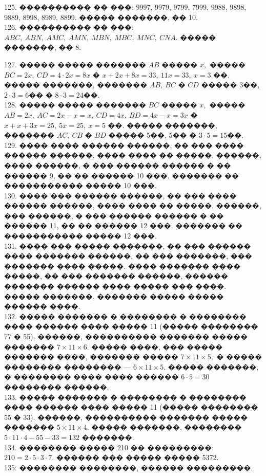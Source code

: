\documentclass[12pt]{article}
\begin{document}
125. ���������� �� ���: 9997, 9979, 9799, 7999, 9988, 9898, 9889, 8998, 8989, 8899. ����� �������, �� 10.\\
126. ���������� �� ���: $ABC,\ ABN,\ AMC,\ AMN,\ MBN,\ MBC,\ MNC,\ CNA.$ ����� �������, �� 8.
\begin{center}
\begin{figure}[ht!]
\end{figure}
\end{center}
127.  ����� ����� ������� $AB$ ����� $x,$ ����� $BC=2x,\ CD=4\cdot2x=8x$ � $x+2x+8x=33,\ 11x=33,\ x=3$ ��. ����� �������, ������� $AB,\ BC$ � $CD$ ����� 3��, $2\cdot3=6$�� � $8\cdot3=24$��.\\
128. ����� ����� ������� $BC$ ����� $x,$ ����� $AB=2x,\ AC=2x-x=x,\ CD=4x,\ BD=4x-x=3x$ � $x+x+3x=25,\ 5x=25,\ x=5$ ��. ����� �������, ������� $AC,\ CB$ � $BD$ ����� 5��, 5�� � $3\cdot5=15$��.\\
129. ���� ���� ������ ������, �� ��� ���� ������ ������, ���� ���� �� �����. ������, ���� ������, � ��� ������ ������ � �� ������ 9, �� �� ������ 10 ���. ������� �� ����������� ����� 10 ���.\\
130. ���� ��� ������ ������, �� ��� ���� ������ ������, ���� ���� �� �����. ������, ��� ������, � ��� ������ ������ � �� ������ 11, �� �� ������ 12 ���. ������� �� ����������� ����� 12 ���.\\
131. ���� ��� ����� �������, �� ��� ������ ���� ������� ������, �� ��� �������, ��� ������� ���� �����. ���� ������� ���� �����, �� ��� ������� ������, ������ ������� ������ ���� ����� ��� ����. ����� �������, ������� ����� ����� ������ ����.\\
132. ����� ������� � �������� � �������� ���� ������ ���� ����� 11 (����� �������� 77 � 55). ������, ���������� ������� ����� ������� $7\times11\times6.$ ����� ����, ��� ����� ������� ����, ������� ����� $7\times11\times5,$ � ����� �������� �������� --- $6\times11\times5.$ ����� �������, � �������� ���� ���� ������ $6\cdot5=30$ �������� ������.\\
133. ����� ������� � �������� � �������� ���� ������ ���� ����� 11 (����� �������� 55 � 33). ������, ���������� ������� ����� ������� $5\times11\times4.$ ����� �������, �������� $5\cdot11\cdot4-55-33=132$ �������.\\
134. �������� ����� 210 �� ���������: $210=2\cdot5\cdot3\cdot7.$ ������ ��� ����� ����� 5372.\\
135. �������� ��������, ������ ���������.
\begin{center}
\begin{figure}[ht!]
\end{figure}
\end{center}
\end{document}
